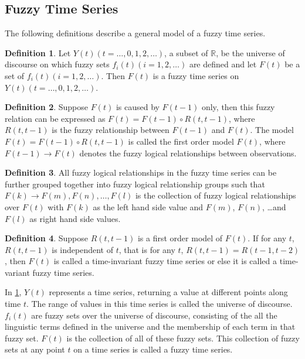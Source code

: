 \documentclass{article}
\theoremstyle{definition}
\newtheorem{ftsdef}{Definition}
\begin{document}
\subsection{Fuzzy Time Series}
\label{fts-design}
The following definitions describe a general model of a fuzzy time series.

\begin{ftsdef}
\label{def1}
Let $Y(t)(t= \ldots,0,1,2, \ldots)$, a subset of $\mathbb{R}$, be the universe of discourse on which fuzzy sets $f_i(t)(i=1,2,\ldots)$ are defined and let $F(t)$ be a set of $f_i(t)(i=1,2,\ldots)$. Then $F(t)$ is a fuzzy time series on $Y(t)(t= \ldots,0,1,2, \ldots)$.
\end{ftsdef}

\begin{ftsdef}
\label{def2}
Suppose $F(t)$ is caused by $F(t-1)$ only, then this fuzzy relation can be expressed as $F(t)=F(t-1) \circ R(t,t-1)$, where $R(t,t-1)$ is the fuzzy relationship between $F(t-1)$ and $F(t)$. The model $F(t)=F(t-1) \circ R(t,t-1)$ is called the first order model $F(t)$, where $F(t-1) \rightarrow F(t)$ denotes the fuzzy logical relationships between observations.
\end{ftsdef}

\begin{ftsdef}
\label{def3}
All fuzzy logical relationships in the fuzzy time series can be further grouped together into fuzzy logical relationship groups such that $F(k) \rightarrow F(m), F(n), \ldots, F(l)$ is the collection of fuzzy logical relationships over $F(t)$ with $F(k)$ as the left hand side value and $F(m)$, $F(n)$, \ldots and $F(l)$ as right hand side values.
\end{ftsdef}

\begin{ftsdef}
\label{def4}
Suppose $R(t,t-1)$ is a first order model of $F(t)$. If for any $t$, $R(t,t-1)$ is independent of $t$, that is for any $t$, $R(t,t-1) = R(t-1,t-2)$, then $F(t)$ is called a time-invariant fuzzy time series or else it is called a time-variant fuzzy time series.
\end{ftsdef}

In \cref{def1}, $Y(t)$ represents a time series, returning a value at different points along time $t$. The range of values in this time series is called the universe of discourse. $f_i(t)$ are fuzzy sets over the universe of discourse, consisting of the all the linguistic terms defined in the universe and the membership of each term in that fuzzy set. $F(t)$ is the collection of all of these fuzzy sets. This collection of fuzzy sets at any point $t$ on a time series is called a fuzzy time series.
\end{document}
